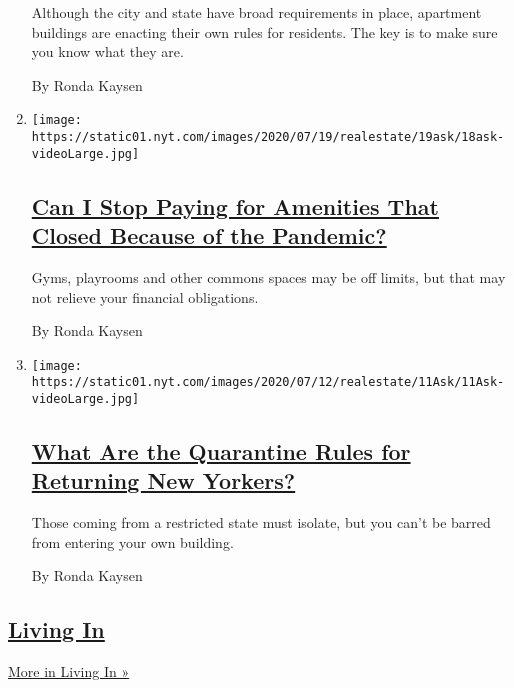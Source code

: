 \begin{enumerate}
  Although the city and state have broad requirements in place,
  apartment buildings are enacting their own rules for residents. The
  key is to make sure you know what they are.

  By Ronda Kaysen
\item
  \texttt{[image: https://static01.nyt.com/images/2020/07/19/realestate/19ask/18ask-videoLarge.jpg]}

  \hypertarget{can-i-stop-paying-for-amenities-that-closed-because-of-the-pandemic}{%
  \subsection{\texorpdfstring{\href{/2020/07/18/realestate/gym-playroom-fees-coronavirus.html}{Can
  I Stop Paying for Amenities That Closed Because of the
  Pandemic?}}{Can I Stop Paying for Amenities That Closed Because of the Pandemic?}}\label{can-i-stop-paying-for-amenities-that-closed-because-of-the-pandemic}}

  Gyms, playrooms and other commons spaces may be off limits, but that
  may not relieve your financial obligations.

  By Ronda Kaysen
\item
  \texttt{[image: https://static01.nyt.com/images/2020/07/12/realestate/11Ask/11Ask-videoLarge.jpg]}

  \hypertarget{what-are-the-quarantine-rules-for-returning-new-yorkers}{%
  \subsection{\texorpdfstring{\href{/2020/07/11/realestate/what-are-the-quarantine-rules-for-returning-new-yorkers-coronavirus.html}{What
  Are the Quarantine Rules for Returning New
  Yorkers?}}{What Are the Quarantine Rules for Returning New Yorkers?}}\label{what-are-the-quarantine-rules-for-returning-new-yorkers}}

  Those coming from a restricted state must isolate, but you can't be
  barred from entering your own building.

  By Ronda Kaysen
\end{enumerate}

\hypertarget{living-in-1}{%
\subsection{\texorpdfstring{\href{/column/living-in}{Living
In}}{Living In}}\label{living-in-1}}

\href{/column/living-in}{More in Living In »}

